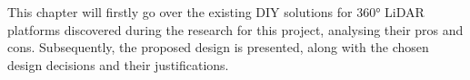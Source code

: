 This chapter will firstly go over the existing DIY solutions for 360° LiDAR platforms discovered during the research for this project, analysing their pros and cons.
Subsequently, the proposed design is presented, along with the chosen design decisions and their justifications.




